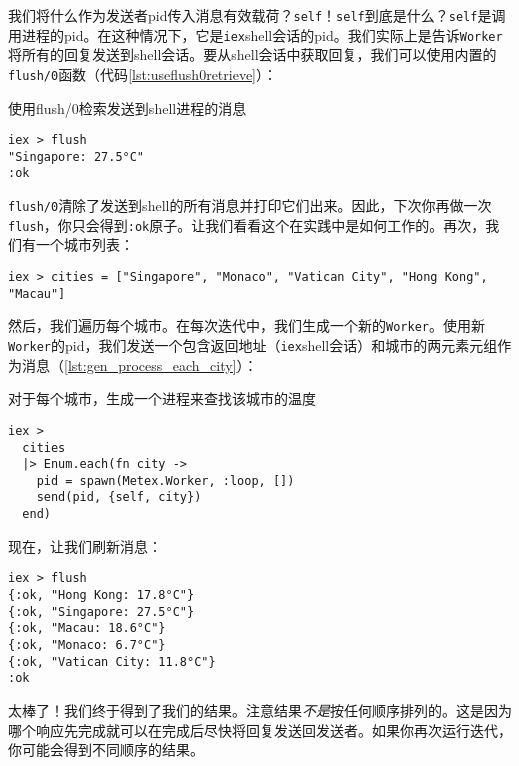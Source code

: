 我们将什么作为发送者pid传入消息有效载荷？\texttt{self}！\texttt{self}到底是什么？\texttt{self}是调用进程的pid。在这种情况下，它是\texttt{iex}shell会话的pid。我们实际上是告诉\texttt{Worker}将所有的回复发送到shell会话。要从shell会话中获取回复，我们可以使用内置的\texttt{flush/0}函数（代码\ref{lst:useflush0retrieve}）：

\begin{code}{使用flush/0检索发送到shell进程的消息}
\begin{verbatim}
iex > flush
"Singapore: 27.5°C"
:ok
\end{verbatim}
\label{lst:useflush0retrieve}
\end{code}

\texttt{flush/0}清除了发送到shell的所有消息并打印它们出来。因此，下次你再做一次\texttt{flush}，你只会得到\texttt{:ok}原子。让我们看看这个在实践中是如何工作的。再次，我们有一个城市列表：

\begin{code}{}
\begin{verbatim}
iex > cities = ["Singapore", "Monaco", "Vatican City", "Hong Kong", "Macau"]
\end{verbatim}
\end{code}

然后，我们遍历每个城市。在每次迭代中，我们生成一个新的\texttt{Worker}。使用新\texttt{Worker}的pid，我们发送一个包含返回地址（\texttt{iex}shell会话）和城市的两元素元组作为消息（\ref{lst:gen_process_each_city}）：


\begin{code}{对于每个城市，生成一个进程来查找该城市的温度}
\begin{verbatim}
iex >
  cities
  |> Enum.each(fn city ->
    pid = spawn(Metex.Worker, :loop, [])
    send(pid, {self, city})
  end)
\end{verbatim}
\label{lst:gen_process_each_city}
\end{code}

现在，让我们刷新消息：

\begin{code}{}
\begin{verbatim}
iex > flush
{:ok, "Hong Kong: 17.8°C"}
{:ok, "Singapore: 27.5°C"}
{:ok, "Macau: 18.6°C"}
{:ok, "Monaco: 6.7°C"}
{:ok, "Vatican City: 11.8°C"}
:ok
\end{verbatim}
\end{code}

太棒了！我们终于得到了我们的结果。注意结果\emph{不是}按任何顺序排列的。这是因为哪个响应先完成就可以在完成后尽快将回复发送回发送者。如果你再次运行迭代，你可能会得到不同顺序的结果。

